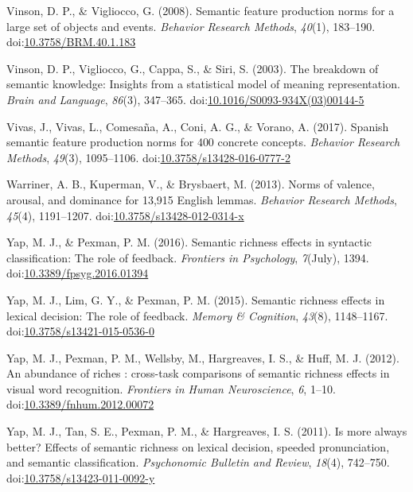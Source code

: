 \documentclass[english,,man]{apa6}
\theoremstyle{definition}
\theoremstyle{definition}
\theoremstyle{definition}
\theoremstyle{remark}
\begin{document}
\hypertarget{ref-Vinson2008}{}
Vinson, D. P., \& Vigliocco, G. (2008). Semantic feature production
norms for a large set of objects and events. \emph{Behavior Research
Methods}, \emph{40}(1), 183--190.
doi:\href{https://doi.org/10.3758/BRM.40.1.183}{10.3758/BRM.40.1.183}

\hypertarget{ref-Vinson2003}{}
Vinson, D. P., Vigliocco, G., Cappa, S., \& Siri, S. (2003). The
breakdown of semantic knowledge: Insights from a statistical model of
meaning representation. \emph{Brain and Language}, \emph{86}(3),
347--365.
doi:\href{https://doi.org/10.1016/S0093-934X(03)00144-5}{10.1016/S0093-934X(03)00144-5}

\hypertarget{ref-Vivas2017}{}
Vivas, J., Vivas, L., Comesaña, A., Coni, A. G., \& Vorano, A. (2017).
Spanish semantic feature production norms for 400 concrete concepts.
\emph{Behavior Research Methods}, \emph{49}(3), 1095--1106.
doi:\href{https://doi.org/10.3758/s13428-016-0777-2}{10.3758/s13428-016-0777-2}

\hypertarget{ref-Warriner2013}{}
Warriner, A. B., Kuperman, V., \& Brysbaert, M. (2013). Norms of
valence, arousal, and dominance for 13,915 English lemmas.
\emph{Behavior Research Methods}, \emph{45}(4), 1191--1207.
doi:\href{https://doi.org/10.3758/s13428-012-0314-x}{10.3758/s13428-012-0314-x}

\hypertarget{ref-Yap2016}{}
Yap, M. J., \& Pexman, P. M. (2016). Semantic richness effects in
syntactic classification: The role of feedback. \emph{Frontiers in
Psychology}, \emph{7}(July), 1394.
doi:\href{https://doi.org/10.3389/fpsyg.2016.01394}{10.3389/fpsyg.2016.01394}

\hypertarget{ref-Yap2015}{}
Yap, M. J., Lim, G. Y., \& Pexman, P. M. (2015). Semantic richness
effects in lexical decision: The role of feedback. \emph{Memory \&
Cognition}, \emph{43}(8), 1148--1167.
doi:\href{https://doi.org/10.3758/s13421-015-0536-0}{10.3758/s13421-015-0536-0}

\hypertarget{ref-Yap2012}{}
Yap, M. J., Pexman, P. M., Wellsby, M., Hargreaves, I. S., \& Huff, M.
J. (2012). An abundance of riches : cross-task comparisons of semantic
richness effects in visual word recognition. \emph{Frontiers in Human
Neuroscience}, \emph{6}, 1--10.
doi:\href{https://doi.org/10.3389/fnhum.2012.00072}{10.3389/fnhum.2012.00072}

\hypertarget{ref-Yap2011}{}
Yap, M. J., Tan, S. E., Pexman, P. M., \& Hargreaves, I. S. (2011). Is
more always better? Effects of semantic richness on lexical decision,
speeded pronunciation, and semantic classification. \emph{Psychonomic
Bulletin and Review}, \emph{18}(4), 742--750.
doi:\href{https://doi.org/10.3758/s13423-011-0092-y}{10.3758/s13423-011-0092-y}
\end{document}
